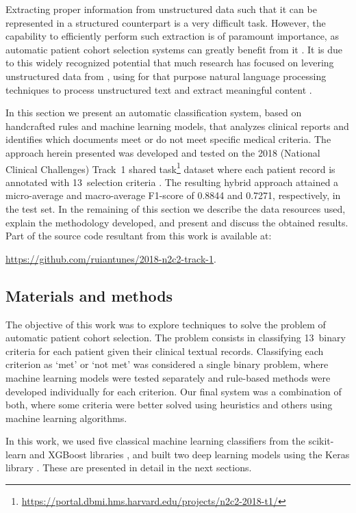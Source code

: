 Extracting proper information from unstructured data such that it can be represented in a structured counterpart is a very difficult task.
However, the capability to efficiently perform such extraction is of paramount importance, as automatic patient cohort selection systems can greatly benefit from it \parencite{shivade2014a}.
It is due to this widely recognized potential that much research has focused on levering unstructured data from , using for that purpose natural language processing techniques to process unstructured text and extract meaningful content \parencite{pathak2013a}.

In this section we present an automatic classification system, based on handcrafted rules and machine learning models, that analyzes clinical reports and identifies which documents meet or do not meet specific medical criteria.
The approach herein presented was developed and tested on the 2018  (National  Clinical Challenges) Track~1 shared task\footnote{\url{https://portal.dbmi.hms.harvard.edu/projects/n2c2-2018-t1/}} dataset where each patient record is annotated with 13~selection criteria \parencite{stubbs2019a}.
The resulting hybrid approach attained a micro-average and macro-average F1-score of 0.8844 and 0.7271, respectively, in the  test set.
In the remaining of this section we describe the data resources used, explain the methodology developed, and present and discuss the obtained results.
Part of the source code resultant from this work is available at:

\centerline{\url{https://github.com/ruiantunes/2018-n2c2-track-1}.}


\subsection{Materials and methods}

The objective of this work was to explore  techniques to solve the problem of automatic patient cohort selection.
The problem consists in classifying 13~binary criteria for each patient given their clinical textual records.
Classifying each criterion as `met' or `not met' was considered a single binary problem, where machine learning models were tested separately and rule-based methods were developed individually for each criterion.
Our final system was a combination of both, where some criteria were better solved using heuristics and others using machine learning algorithms.

In this work, we used five classical machine learning classifiers from the scikit-learn and XGBoost libraries \parencite{pedregosa2011a,chen2016a}, and built two deep learning models using the Keras library \parencite{chollet2015a}.
These are presented in detail in the next sections.


